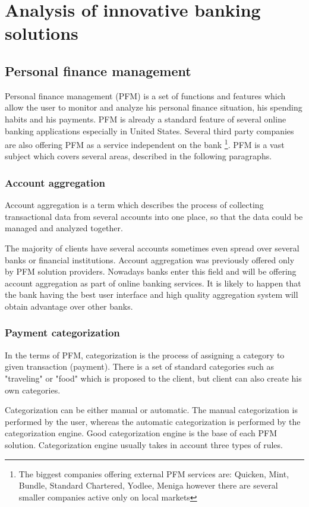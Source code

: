 \chapter{Analysis of innovative banking solutions}

\section{Personal finance management}

Personal finance management (PFM) is a set of functions and features which allow the user to monitor and analyze his personal finance situation, his spending habits and his payments. PFM is already a standard feature of several online banking applications especially in United States. Several third party companies are also offering PFM as a service independent on the bank \footnote{The biggest companies offering external PFM services are: Quicken, Mint, Bundle, Standard Chartered, Yodlee, Meniga however there are several smaller companies active only on local markets}. PFM is a vast subject which covers several areas, described in the following paragraphs.

\subsection{Account aggregation}
Account aggregation is a term which describes the process of collecting transactional data from several accounts into one place, so that the data could be managed and analyzed together.

The majority of clients have several accounts sometimes even spread over several banks or financial institutions. Account aggregation was previously offered only by PFM solution providers. Nowadays banks enter this field and will be offering account aggregation as part of online banking services. It is likely to happen that the bank having the best user interface and high quality aggregation system will obtain advantage over other banks.

\subsection{Payment categorization}
In the terms of PFM, categorization is the process of assigning a category to given transaction (payment). There is a set of standard categories such as "traveling" or "food" which is proposed to the client, but client can also create his own categories.

Categorization can be either manual or automatic. The manual categorization is performed by the user, whereas the automatic categorization is performed by the categorization engine. Good categorization engine is the base of each PFM solution. Categorization engine usually takes in account three types of rules.

